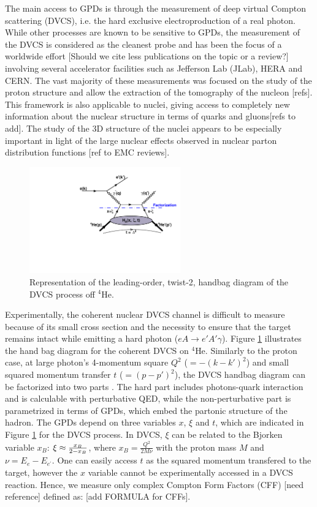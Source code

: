 \documentclass[nofootinbib,twocolumn,showpacs,prl,superscriptaddress,secnumarabic,amssymb,nobibnotes,aps,floatfix]{revtex4}
\begin{document}
The main access to GPDs is through the measurement of deep virtual Compton 
scattering (DVCS), i.e. the hard exclusive electroproduction of a real photon. 
While other processes are known to be sensitive to GPDs, the measurement of the
DVCS is considered as the cleanest probe and has been the focus of a worldwide effort 
\cite{Stepanyan:2001sm,Airapetian,Chekanov:2003ya,Aktas:2005ty,Chen:2006na,Munoz 
Camacho:2006hx,Girod:2007aa,Gavalian:2009,Seder:2015,Pisano:2015,Jo:2015ema} 
[Should we cite less publications on the topic or a review?]
involving several accelerator facilities such as Jefferson Lab (JLab), HERA and  
CERN. The vast majority of these measurements was focused on the study of the 
proton structure and allow the extraction of the tomography of the nucleon [refs].
This framework is also applicable to nuclei, giving access to completely new 
information about the nuclear structure in terms of quarks and gluons[refs to add].
The study of the 3D structure of the nuclei appears to be especially important
in light of the large nuclear effects observed in nuclear parton distribution 
functions [ref to EMC reviews]. 

\begin{figure}[tb]
\includegraphics[width=6.5cm]{figs/DVCS_diagram.pdf}
\caption{Representation of the leading-order, twist-2, handbag diagram of the 
DVCS process off $^4$He.}
\label{fig:diags}
\end{figure}

Experimentally, the coherent nuclear DVCS channel is difficult to measure because of 
its small cross section and the necessity to ensure that the target remains 
intact while emitting a hard photon ($eA \rightarrow e' A' \gamma$). Figure 
\ref{fig:diags} illustrates the hand bag diagram for the coherent DVCS on 
$^4$He. Similarly to the proton case, at large photon's 4-momentum square 
$Q^2$ ($= -(k-k')^{2}$) and small squared momentum transfer $t$ 
($= (p-p')^{2}$), the DVCS handbag diagram can be factorized into two parts 
\cite{Freund_Collins,Ji_Osborne}. The hard part includes photons-quark 
interaction and is calculable with perturbative QED, while the non-perturbative 
part is parametrized in terms of GPDs, which embed the partonic structure of 
the hadron. The GPDs depend on three variables $x$, $\xi$ and $t$, which are 
indicated in Figure \ref{fig:diags} for the DVCS process. In DVCS, $\xi$ can 
be related to the Bjorken variable $x_{B}$: $\xi\approx {{x_B}\over{2-x_B}}$, 
where $x_B=\frac{Q^2}{2M\nu}$ with the proton mass $M$ and 
$\nu=E_e-E_{e^\prime}$. One can easily access $t$ as the squared momentum 
transfered to the target, however the $x$ variable cannot be experimentally 
accessed in a DVCS reaction. Hence, we measure only complex Compton Form 
Factors (CFF) [need reference] defined as: [add FORMULA for CFFs]. 
\end{document}
